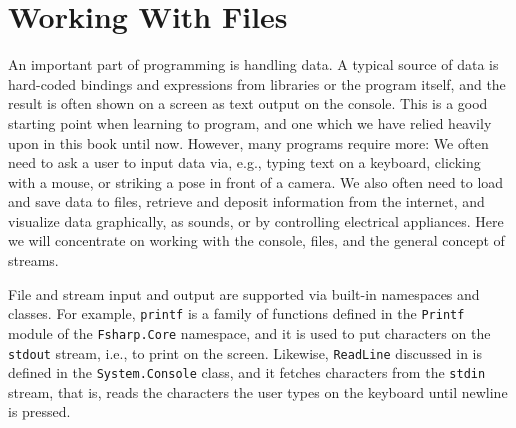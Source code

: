 \documentclass[fsharpNotes.tex]{subfiles}
\begin{document}
\chapter{Working With Files}
\label{chap:IO}


An important part of programming is handling data. A typical source of data is hard-coded bindings and expressions from libraries or the program itself, and the result is often shown on a screen as text output on the console. This is a good starting point when learning to program, and one which we have relied heavily upon in this book until now. However, many programs require more: We often need to ask a user to input data via, e.g., typing text on a keyboard, clicking with a mouse, or striking a pose in front of a camera. We also often need to load and save data to files, retrieve and deposit information from the internet, and visualize data graphically, as sounds, or by controlling electrical appliances. Here we will concentrate on working with the console, files, and the general concept of streams.

File and stream input and output are supported via built-in namespaces and classes. For example, \lstinline!printf! is a family of functions defined in the \lstinline!Printf! module of the \lstinline!Fsharp.Core! namespace, and it is used to put characters on the \lstinline{stdout} stream, i.e., to print on the screen. Likewise, \lstinline{ReadLine} discussed in  is defined in the \lstinline{System.Console} class, and it fetches characters from the \lstinline{stdin} stream, that is, reads the characters the user types on the keyboard until newline is pressed.
\end{document}
